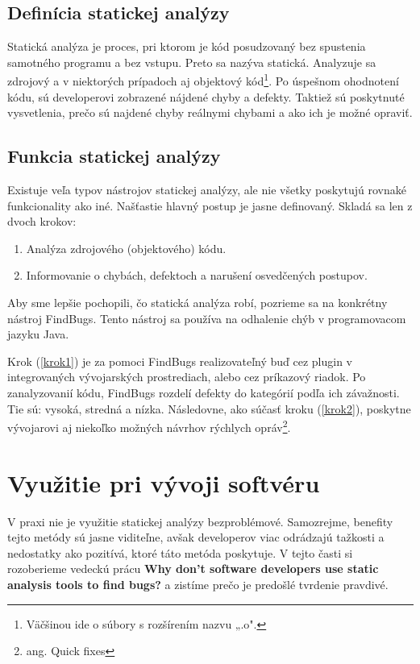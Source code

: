 \documentclass[10pt,twoside,slovak,a4paper]{article}
\begin{document}
\subsection{Definícia statickej analýzy} \label{principy:co}
Statická analýza je proces, pri ktorom je kód posudzovaný bez spustenia samotného programu a bez vstupu. Preto sa
nazýva statická. Analyzuje sa zdrojový a v niektorých prípadoch aj objektový kód\footnote{Väčšinou ide o súbory s
	rozšírením nazvu „.o".}. Po úspešnom ohodnotení kódu, sú developerovi zobrazené nájdené chyby a defekty. Taktiež sú
poskytnuté vysvetlenia, prečo sú najdené chyby reálnymi chybami a ako ich je možné opraviť.\cite{wiki:Static_program_analysis}

\subsection{Funkcia statickej analýzy} \label{principy:ako}
Existuje veľa typov nástrojov statickej analýzy, ale nie všetky poskytujú rovnaké funkcionality ako iné. Našťastie
hlavný postup je jasne definovaný. Skladá sa len z dvoch krokov:

\begin{enumerate}
	\item Analýza zdrojového (objektového) kódu. \label{krok1}
	\item Informovanie o chybách, defektoch a narušení osvedčených postupov. \label{krok2}
\end{enumerate}

Aby sme lepšie pochopili, čo statická analýza robí, pozrieme sa na konkrétny nástroj FindBugs. Tento
nástroj sa používa na odhalenie chýb v programovacom jazyku Java.\cite{FindBugs}

Krok (\ref{krok1}) je za pomoci FindBugs realizovateľný buď cez plugin v integrovaných vývojarských prostrediach, alebo
cez príkazový riadok. Po zanalyzovanií kódu, FindBugs rozdelí defekty do kategórií podľa ich závažnosti. Tie sú:
vysoká, stredná a nízka. Následovne, ako súčasť kroku (\ref{krok2}), poskytne vývojarovi aj niekoľko možných návrhov
rýchlych opráv\footnote{ang. Quick fixes}.\cite{BrittanyJohnson,NathanAyewah}


\section{Využitie pri vývoji softvéru} \label{vyuzitie}
V praxi nie je využitie statickej analýzy bezproblémové. Samozrejme, benefity tejto metódy sú jasne viditeľne, avšak
developerov viac odrádzajú tažkosti a nedostatky ako pozitívá, ktoré táto metóda poskytuje. V tejto časti si
rozoberieme vedeckú prácu \textbf{Why don't software developers use static analysis tools to find bugs?}\cite{BrittanyJohnson}
a zistíme prečo je predošlé tvrdenie pravdivé.
\end{document}

